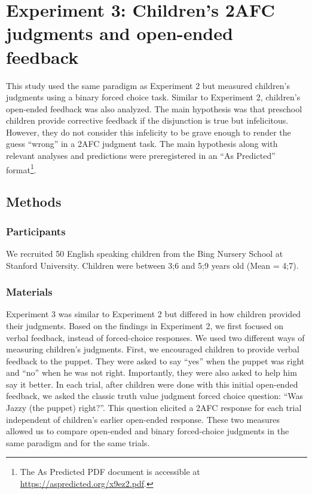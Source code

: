 \documentclass[,man,floatsintext]{apa6}
\let\rmarkdownfootnote\footnote%
\def\footnote{\protect\rmarkdownfootnote}
\begin{document}
\hypertarget{study3}{%
\section{Experiment 3: Children's 2AFC judgments and open-ended feedback}\label{study3}}

This study used the same paradigm as Experiment 2 but measured children's judgments using a binary forced choice task. Similar to Experiment 2, children's open-ended feedback was also analyzed. The main hypothesis was that preschool children provide corrective feedback if the disjunction is true but infelicitous. However, they do not consider this infelicity to be grave enough to render the guess \enquote{wrong} in a 2AFC judgment task. The main hypothesis along with relevant analyses and predictions were preregistered in an \enquote{As Predicted} format\footnote{The As Predicted PDF document is accessible at \url{https://aspredicted.org/x9ez2.pdf}.}.

\hypertarget{methods-2}{%
\subsection{Methods}\label{methods-2}}

\hypertarget{participants-2}{%
\subsubsection{Participants}\label{participants-2}}

We recruited 50 English speaking children from the Bing Nursery School at Stanford University. Children were between 3;6 and 5;9 years old (Mean = 4;7).

\hypertarget{materials-1}{%
\subsubsection{Materials}\label{materials-1}}

Experiment 3 was similar to Experiment 2 but differed in how children provided their judgments. Based on the findings in Experiment 2, we first focused on verbal feedback, instead of forced-choice responses. We used two different ways of measuring children's judgments. First, we encouraged children to provide verbal feedback to the puppet. They were asked to say \enquote{yes} when the puppet was right and \enquote{no} when he was not right. Importantly, they were also asked to help him say it better. In each trial, after children were done with this initial open-ended feedback, we asked the classic truth value judgment forced choice question: \enquote{Was Jazzy (the puppet) right?}. This question elicited a 2AFC response for each trial independent of children's earlier open-ended response. These two measures allowed us to compare open-ended and binary forced-choice judgments in the same paradigm and for the same trials.
\end{document}
